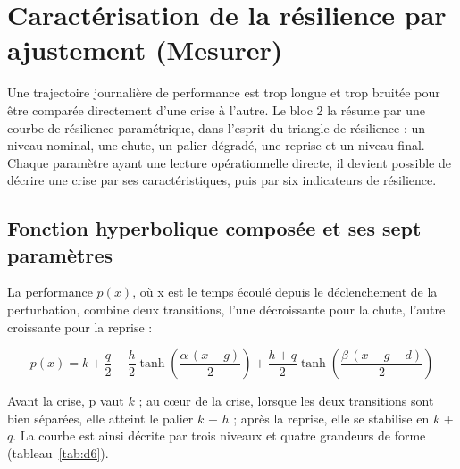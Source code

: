 
\section{Caractérisation de la résilience par ajustement (Mesurer)}
\label{sec:4}

Une trajectoire journalière de performance est trop longue et trop bruitée pour être comparée directement d'une crise à l'autre. Le bloc 2 la résume par une courbe de résilience paramétrique, dans l'esprit du triangle de résilience \citep{bruneau2003} : un niveau nominal, une chute, un palier dégradé, une reprise et un niveau final. Chaque paramètre ayant une lecture opérationnelle directe, il devient possible de décrire une crise par ses caractéristiques, puis par six indicateurs de résilience.

\subsection{Fonction hyperbolique composée et ses sept paramètres}
\label{sec:4.1}

La performance $p(x)$, où x est le temps écoulé depuis le déclenchement de la perturbation, combine deux transitions, l'une décroissante pour la chute, l'autre croissante pour la reprise \citep{rahiel2026in4pl} :

\begin{equation}
p(x) = k + \frac{q}{2} - \frac{h}{2}\tanh\left(\frac{\alpha\,(x - g)}{2}\right) + \frac{h + q}{2}\tanh\left(\frac{\beta\,(x - g - d)}{2}\right)
\label{eq:5}
\end{equation}

Avant la crise, p vaut $k$ ; au cœur de la crise, lorsque les deux transitions sont bien séparées, elle atteint le palier $k$ $-$ $h$ ; après la reprise, elle se stabilise en $k$ + $q$. La courbe est ainsi décrite par trois niveaux et quatre grandeurs de forme (tableau~\ref{tab:d6}).

